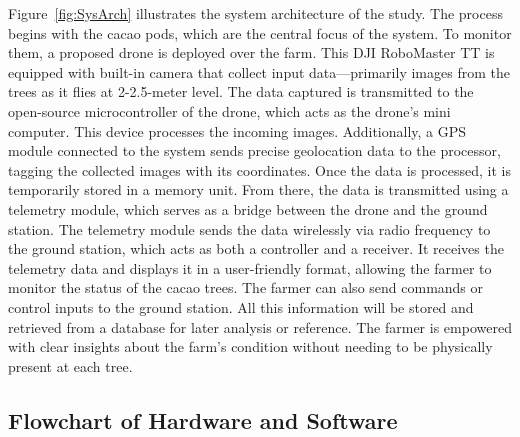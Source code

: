 Figure~\ref{fig:SysArch} illustrates the system architecture of the study. The process begins with the cacao pods, which are the central focus of the system. To monitor them, a proposed drone is deployed over the farm. This DJI RoboMaster TT is equipped with built-in camera that collect input data—primarily images from the trees as it flies at 2-2.5-meter level. The data captured is transmitted to the open-source microcontroller of the drone, which acts as the drone’s mini computer. This device processes the incoming images. Additionally, a GPS module connected to the system sends precise geolocation data to the processor, tagging the collected images with its coordinates. Once the data is processed, it is temporarily stored in a memory unit. From there, the data is transmitted using a telemetry module, which serves as a bridge between the drone and the ground station. The telemetry module sends the data wirelessly via radio frequency to the ground station, which acts as both a controller and a receiver. It receives the telemetry data and displays it in a user-friendly format, allowing the farmer to monitor the status of the cacao trees. The farmer can also send commands or control inputs to the ground station. All this information will be stored and retrieved from a database for later analysis or reference. The farmer is empowered with clear insights about the farm’s condition without needing to be physically present at each tree.

\subsection{Flowchart of Hardware and Software}

